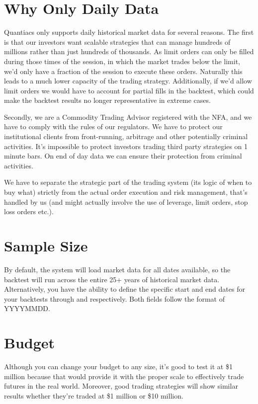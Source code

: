 \documentclass[letterpaper,10pt,english]{sphinxmanual}
\begin{document}
\section{Why Only Daily Data}
\label{settings:why-only-daily-data}
Quantiacs only supports daily historical market data for several reasons. The first is that our investors want scalable strategies that can manage hundreds of millions rather than just hundreds of thousands. As limit orders can only be filled during those times of the session, in which the market trades below the limit, we'd only have a fraction of the session to execute these orders. Naturally this leads to a much lower capacity of the trading strategy. Additionally, if we'd allow limit orders we would have to account for partial fills in the backtest, which could make the backtest results no longer representative in extreme cases.

Secondly, we are a Commodity Trading Advisor registered with the NFA, and we have to comply with the rules of our regulators. We have to protect our institutional clients from front-running, arbitrage and other potentially criminal activities. It's impossible to protect investors trading third party strategies on 1 minute bars. On end of day data we can ensure their protection from criminal activities.

We have to separate the strategic part of the trading system (its logic of when to buy what) strictly from the actual order execution and risk management, that's handled by us (and might actually involve the use of leverage, limit orders, stop loss orders etc.).


\section{Sample Size}
\label{settings:sample-size}
By default, the system will load market data for all dates available, so the backtest will run across the entire 25+ years of historical market data. Alternatively, you have the ability to define the specific start and end dates for your backtests through  and  respectively. Both fields follow the format of YYYYMMDD.


\section{Budget}
\label{settings:budget}
Although you can change your budget to any size, it's good to test it at \$1 million because that would provide it with the proper scale to effectively trade futures in the real world. Moreover, good trading strategies will show similar results whether they're traded at \$1 million or \$10 million.
\end{document}
